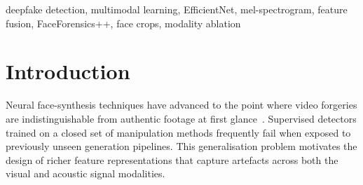\documentclass[conference]{IEEEtran}
\begin{document}
\maketitle

\begin{abstract}
Deepfake detection systems that rely on visual features alone are susceptible to unseen manipulation 
techniques. This paper presents a supervised multimodal framework that jointly exploits spatiotemporal 
visual features extracted by an EfficientNet backbone and acoustic features derived from mel-spectrogram 
representations, fused via late concatenation. The system is trained and evaluated on FaceForensics++ 
(c23 compression, 1,000 real videos and 1,000 manipulated videos encompassing four manipulation methods) 
using face-cropped frame sequences. On the held-out test partition of 641 videos, the model achieves 
an AUC of 0.9267, accuracy of 88.45\%, and F1-score of 0.9267. A balanced training variant 
improves AUC to 0.9290 and accuracy to 88.61\%. Per-method analysis reveals the highest 
per-class accuracy on Face2Face (98.33\%) and the lowest on original (real) videos (66.00\%), 
indicating a class-imbalance artifact warranting further mitigation. The proposed framework 
demonstrates that multimodal fusion is a viable direction for generalisable deepfake detection 
without relying on self-supervised pre-training or identity-reference data.
\end{abstract}

\begin{IEEEkeywords}
deepfake detection, multimodal learning, EfficientNet, mel-spectrogram, feature fusion, FaceForensics++, face crops, modality ablation
\end{IEEEkeywords}

\section{Introduction}
\label{sec:intro}

Neural face-synthesis techniques have advanced to the point where video forgeries are 
indistinguishable from authentic footage at first glance~\cite{rossler2019faceforensics}. 
Supervised detectors trained on a closed set of manipulation methods frequently fail when 
exposed to previously unseen generation pipelines. 
This generalisation problem motivates the design of richer feature representations that 
capture artefacts across both the visual and acoustic signal modalities.
\end{document}
